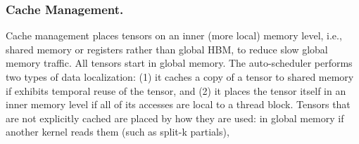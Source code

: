 \subsubsection{Cache Management.}
Cache management places tensors on an inner (more local) memory level,
i.e., shared memory or registers rather than global HBM, to reduce slow global memory traffic.
All tensors start in global memory. The auto-scheduler performs two types of data
localization: (1) it caches a copy of a tensor to shared memory if  exhibits temporal reuse of the tensor, and (2) it places the tensor itself
in an inner memory level if all of its accesses are local to a thread block.
Tensors that are not explicitly cached are placed by how they are used:
in global memory if another kernel reads them (such as split-k partials),

